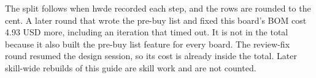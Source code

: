 The split follows when hwde recorded each step, and the rows are rounded to the cent. A later round that wrote the pre-buy list and fixed this board's BOM cost 4.93 USD more, including an iteration that timed out. It is not in the total because it also built the pre-buy list feature for every board. The review-fix round resumed the design session, so its cost is already inside the total. Later skill-wide rebuilds of this guide are skill work and are not counted.


